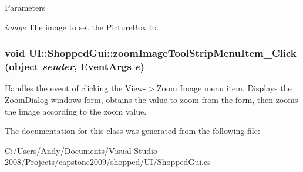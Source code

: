 \begin{DoxyParams}{Parameters}
\item[{\em image}]The image to set the PictureBox to. \end{DoxyParams}
\hypertarget{class_u_i_1_1_shopped_gui_a5f99b03c74d01734153873d6c35fbdf3}{
\subsubsection[{zoomImageToolStripMenuItem\_\-Click}]{\setlength{\rightskip}{0pt plus 5cm}void UI::ShoppedGui::zoomImageToolStripMenuItem\_\-Click (object {\em sender}, \/  EventArgs {\em e})}}
\label{class_u_i_1_1_shopped_gui_a5f99b03c74d01734153873d6c35fbdf3}
Handles the event of clicking the View-\/$>$Zoom Image menu item. Displays the \hyperlink{class_u_i_1_1_zoom_dialog}{ZoomDialog} windows form, obtains the value to zoom from the form, then zooms the image according to the zoom value. 

The documentation for this class was generated from the following file:\begin{DoxyCompactItemize}
\item 
C:/Users/Andy/Documents/Visual Studio 2008/Projects/capstone2009/shopped/UI/ShoppedGui.cs\end{DoxyCompactItemize}
